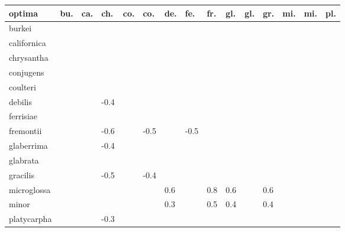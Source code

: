 \begin{table}[ht]
\centering
\begin{tabular}{lllllllllllllll}
  \hline
optima & bu. & ca. & ch. & co. & co. & de. & fe. & fr. & gl. & gl. & gr. & mi. & mi. & pl. \\ 
  \hline
burkei &  &  &  &  &  &  &  &  &  &  &  &  &  &  \\ 
  californica &  &  &  &  &  &  &  &  &  &  &  &  &  &  \\ 
  chrysantha &  &  &  &  &  &  &  &  &  &  &  &  &  &  \\ 
  conjugens &  &  &  &  &  &  &  &  &  &  &  &  &  &  \\ 
  coulteri &  &  &  &  &  &  &  &  &  &  &  &  &  &  \\ 
  debilis &  &  & -0.4 &  &  &  &  &  &  &  &  &  &  &  \\ 
  ferrisiae &  &  &  &  &  &  &  &  &  &  &  &  &  &  \\ 
  fremontii &  &  & -0.6 &  & -0.5 &  & -0.5 &  &  &  &  &  &  &  \\ 
  glaberrima &  &  & -0.4 &  &  &  &  &  &  &  &  &  &  &  \\ 
  glabrata &  &  &  &  &  &  &  &  &  &  &  &  &  &  \\ 
  gracilis &  &  & -0.5 &  & -0.4 &  &  &  &  &  &  &  &  &  \\ 
  microglossa &  &  &  &  &  & 0.6 &  & 0.8 & 0.6 &  & 0.6 &  &  &  \\ 
  minor &  &  &  &  &  & 0.3 &  & 0.5 & 0.4 &  & 0.4 &  &  &  \\ 
  platycarpha &  &  & -0.3 &  &  &  &  &  &  &  &  &  &  &  \\ 
   \hline
\end{tabular}
\end{table}
